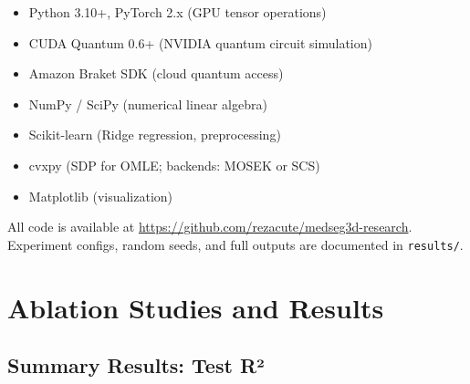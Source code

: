 
\begin{itemize}
  \item Python 3.10+, PyTorch 2.x (GPU tensor operations)
  \item CUDA Quantum 0.6+ (NVIDIA quantum circuit simulation)
  \item Amazon Braket SDK (cloud quantum access)
  \item NumPy / SciPy (numerical linear algebra)
  \item Scikit-learn (Ridge regression, preprocessing)
  \item cvxpy (SDP for OMLE; backends: MOSEK or SCS)
  \item Matplotlib (visualization)
\end{itemize}


All code is available at
\url{https://github.com/rezacute/medseg3d-research}. Experiment
configs, random seeds, and full outputs are documented in
\verb|results/|.



\section{Ablation Studies and Results}
\label{sec:ablations}


\subsection{Summary Results: Test R²}



